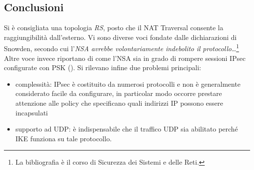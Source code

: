 \subsection{Conclusioni}
Si è consigliata una topologia \textit{RS}, posto che il NAT Traversal consente
la raggiungibilità dall'esterno.
Vi sono diverse voci fondate dalle dichiarazioni di Snowden, secondo cui l'\textit{NSA avrebbe volontariamente
indebolito il protocollo}\ldots\footnote{La bibliografia è il corso di Sicurezza dei Sistemi
e delle Reti.}
Altre voce invece riportano di come l'NSA sia in grado di rompere sessioni IPsec
configurate con PSK (\cite{ipsec-nsa}).
Si rilevano infine due problemi principali:
\begin{itemize}
  \item complessità: IPsec è costituito da numerosi protocolli e non è generalmente considerato
  facile da configurare, in particolar modo occorre prestare attenzione alle policy che specificano
  quali indirizzi IP possono essere incapsulati
  \item supporto ad UDP: è indispensabile che il traffico UDP sia abilitato perché IKE funziona
  su tale protocollo.
\end{itemize}

